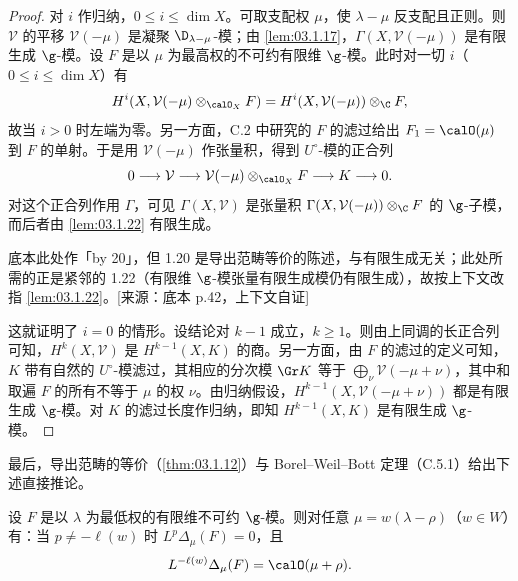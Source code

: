 \begin{proof}
对 $i$ 作归纳，$0\le i\le\dim X$。可取支配权 $\mu$，使 $\lambda-\mu$ 反支配且正则。则 $\mathcal{V}$ 的平移 $\mathcal{V}(-\mu)$ 是凝聚 $\D_{\lambda-\mu}$-模；由 \ref{lem:03.1.17}，$\Gamma(X,\mathcal{V}(-\mu))$ 是有限生成 $\g$-模。设 $F$ 是以 $\mu$ 为最高权的不可约有限维 $\g$-模。此时对一切 $i$（$0\le i\le\dim X$）有
$$H^i(X,\mathcal{V}(-\mu)\otimes_{\calO_X}F)=H^i(X,\mathcal{V}(-\mu))\otimes_\C F,$$
故当 $i>0$ 时左端为零。另一方面，C.2 中研究的 $F$ 的滤过给出 $F_1=\calO(\mu)$ 到 $F$ 的单射。于是用 $\mathcal{V}(-\mu)$ 作张量积，得到 $U^\circ$-模的正合列
$$0\longrightarrow\mathcal{V}\longrightarrow\mathcal{V}(-\mu)\otimes_{\calO_X}F\longrightarrow K\longrightarrow 0.$$
对这个正合列作用 $\Gamma$，可见 $\Gamma(X,\mathcal{V})$ 是张量积 $\Gamma(X,\mathcal{V}(-\mu))\otimes_\C F$ 的 $\g$-子模，而后者由 \ref{lem:03.1.22} 有限生成。

\begin{annote}
底本此处作「by 20」，但 1.20 是导出范畴等价的陈述，与有限生成无关；此处所需的正是紧邻的 1.22（有限维 $\g$-模张量有限生成模仍有限生成），故按上下文改指 \ref{lem:03.1.22}。[来源：底本 p.42，上下文自证]
\end{annote}

这就证明了 $i=0$ 的情形。设结论对 $k-1$ 成立，$k\ge 1$。则由上同调的长正合列可知，$H^k(X,\mathcal{V})$ 是 $H^{k-1}(X,K)$ 的商。另一方面，由 $F$ 的滤过的定义可知，$K$ 带有自然的 $U^\circ$-模滤过，其相应的分次模 $\Gr K$ 等于 $\bigoplus_\nu\mathcal{V}(-\mu+\nu)$，其中和取遍 $F$ 的所有不等于 $\mu$ 的权 $\nu$。由归纳假设，$H^{k-1}(X,\mathcal{V}(-\mu+\nu))$ 都是有限生成 $\g$-模。对 $K$ 的滤过长度作归纳，即知 $H^{k-1}(X,K)$ 是有限生成 $\g$-模。
\end{proof}

最后，导出范畴的等价（\ref{thm:03.1.12}）与 Borel--Weil--Bott 定理（C.5.1）给出下述直接推论。

\begin{proposition}\label{prop:03.1.24}
设 $F$ 是以 $\lambda$ 为最低权的有限维不可约 $\g$-模。则对任意 $\mu=w(\lambda-\rho)$（$w\in W$）有：当 $p\ne-\ell(w)$ 时 $L^p\Delta_\mu(F)=0$，且
$$L^{-\ell(w)}\Delta_\mu(F)=\calO(\mu+\rho).$$
\end{proposition}
